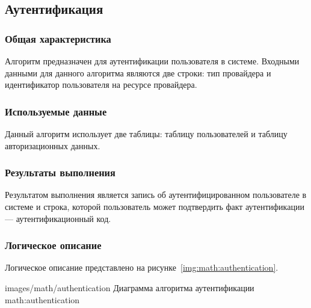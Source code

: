 \subsection{Аутентификация}

\subsubsection{Общая характеристика}

Алгоритм предназначен для аутентификации пользователя в системе. Входными данными для данного алгоритма являются две строки: тип провайдера и идентификатор пользователя на ресурсе провайдера.

\subsubsection{Используемые данные}

Данный алгоритм использует две таблицы: таблицу пользователей и таблицу авторизационных данных.

\subsubsection{Результаты выполнения}

Результатом выполнения является запись об аутентифицированном пользователе в системе и строка, которой пользователь может подтвердить факт аутентификации --- аутентификационный код.

\subsubsection{Логическое описание}

Логическое описание представлено на рисунке~\ref{img:math:authentication}.


            {images/math/authentication}
            {Диаграмма алгоритма аутентификации}
            {math:authentication}
